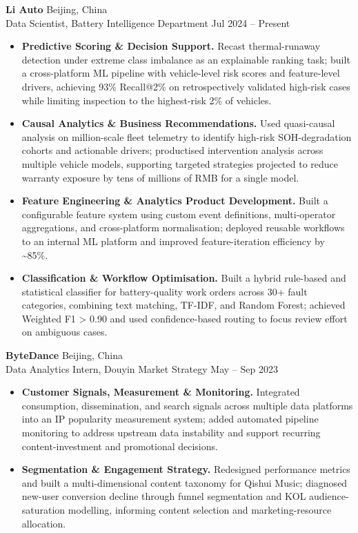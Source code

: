 \documentclass[a4paper,10pt]{article}
\begin{document}
\noindent\textbf{Li Auto} \hfill Beijing, China\\
Data Scientist, Battery Intelligence Department \hfill Jul 2024 -- Present
\begin{itemize}
    \item \textbf{Predictive Scoring \& Decision Support.} Recast thermal-runaway detection under extreme class imbalance as an explainable ranking task; built a cross-platform ML pipeline with vehicle-level risk scores and feature-level drivers, achieving 93\% Recall@2\% on retrospectively validated high-risk cases while limiting inspection to the highest-risk 2\% of vehicles.

    \item \textbf{Causal Analytics \& Business Recommendations.} Used quasi-causal analysis on million-scale fleet telemetry to identify high-risk SOH-degradation cohorts and actionable drivers; productised intervention analysis across multiple vehicle models, supporting targeted strategies projected to reduce warranty exposure by tens of millions of RMB for a single model.

    \item \textbf{Feature Engineering \& Analytics Product Development.} Built a configurable feature system using custom event definitions, multi-operator aggregations, and cross-platform normalisation; deployed reusable workflows to an internal ML platform and improved feature-iteration efficiency by \textasciitilde85\%.

    \item \textbf{Classification \& Workflow Optimisation.} Built a hybrid rule-based and statistical classifier for battery-quality work orders across 30+ fault categories, combining text matching, TF-IDF, and Random Forest; achieved Weighted F1 > 0.90 and used confidence-based routing to focus review effort on ambiguous cases.
\end{itemize}

\vspace{2pt}
\noindent\textbf{ByteDance} \hfill Beijing, China\\
Data Analytics Intern, Douyin Market Strategy \hfill May -- Sep 2023
\begin{itemize}
    \item \textbf{Customer Signals, Measurement \& Monitoring.} Integrated consumption, dissemination, and search signals across multiple data platforms into an IP popularity measurement system; added automated pipeline monitoring to address upstream data instability and support recurring content-investment and promotional decisions.

    \item \textbf{Segmentation \& Engagement Strategy.} Redesigned performance metrics and built a multi-dimensional content taxonomy for Qishui Music; diagnosed new-user conversion decline through funnel segmentation and KOL audience-saturation modelling, informing content selection and marketing-resource allocation.
\end{itemize}
\end{document}
